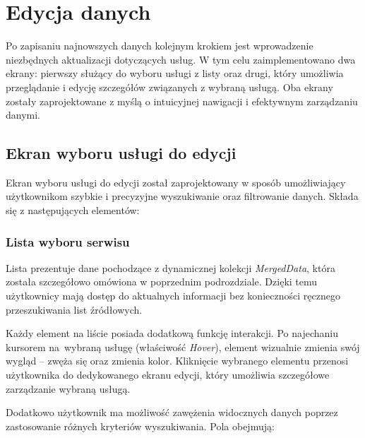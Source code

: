 \section{Edycja danych}

Po zapisaniu najnowszych danych kolejnym krokiem jest wprowadzenie niezbędnych aktualizacji dotyczących usług. W tym celu zaimplementowano dwa ekrany: pierwszy służący do wyboru usługi z listy oraz drugi, który umożliwia przeglądanie i edycję szczegółów związanych z wybraną usługą. Oba ekrany zostały zaprojektowane z myślą o intuicyjnej nawigacji i efektywnym zarządzaniu danymi.

\subsection{Ekran wyboru usługi do edycji}


Ekran wyboru usługi do edycji został zaprojektowany w sposób umożliwiający użytkownikom szybkie i precyzyjne wyszukiwanie oraz filtrowanie danych. Składa się z następujących elementów:

\subsubsection*{Lista wyboru serwisu}

Lista prezentuje dane pochodzące z dynamicznej kolekcji \emph{MergedData}, która została szczegółowo omówiona w poprzednim podrozdziale. Dzięki temu użytkownicy mają dostęp do aktualnych informacji bez konieczności ręcznego przeszukiwania list źródłowych.

Każdy element na liście posiada dodatkową funkcję interakcji. Po najechaniu kursorem na~wybraną usługę (właściwość \emph{Hover}), element wizualnie zmienia swój wygląd -- zwęża się oraz zmienia kolor. Kliknięcie wybranego elementu przenosi użytkownika do dedykowanego ekranu edycji, który umożliwia szczegółowe zarządzanie wybraną usługą.

Dodatkowo użytkownik ma możliwość zawężenia widocznych danych poprzez zastosowanie różnych kryteriów wyszukiwania. Pola obejmują:

